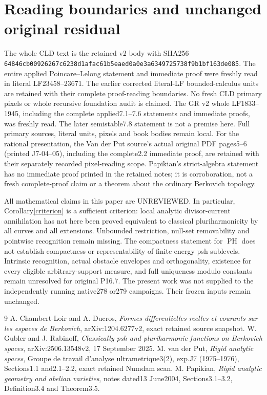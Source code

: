 \documentclass[11pt]{article}
\newcommand{\PH}{\operatorname{PH}}
\begin{document}
\section{Reading boundaries and unchanged original residual}
The whole CLD text is the retained v2 body with SHA256
\texttt{64846cb00926267c6238d1afac61b5eaed0a0e3a6349725738f9b1bf163de085}.
The entire applied Poincare--Lelong statement and immediate proof were
freshly read in literal LF23458--23671. The earlier corrected literal-LF
bounded-calculus units are retained with their complete proof-reading
boundaries. No fresh CLD primary pixels or whole recursive foundation
audit is claimed. The GR v2 whole LF1833--1945, including the complete
applied7.1--7.6 statements and immediate proofs, was freshly read.
The later semistable7.8 statement is not a premise here. Full primary
sources, literal units, pixels and book bodies remain local.
For the rational presentation, the Van der Put source's actual original
PDF pages5--6 (printed J7-04--05), including the complete2.2 immediate
proof, are retained with their separately recorded pixel-reading scope.
Papikian's strict-algebra statement has no immediate proof printed in
the retained notes; it is corroboration, not a fresh complete-proof
claim or a theorem about the ordinary Berkovich topology.

All mathematical claims in this paper are UNREVIEWED. In particular,
Corollary\ref{criterion} is a sufficient criterion: local analytic
divisor-current annihilation has not here been proved equivalent to
classical pluriharmonicity by all curves and all extensions. Unbounded
restriction, null-set removability and pointwise recognition remain
missing. The compactness statement for $\PH$ does not establish
compactness or representability of finite-energy psh sublevels.
Intrinsic recognition, actual obstacle envelopes and orthogonality,
existence for every eligible arbitrary-support measure, and full
uniqueness modulo constants remain unresolved for original P16.7.
The present work was not supplied to the independently running
native278 or279 campaigns. Their frozen inputs remain unchanged.

\begin{thebibliography}{9}
 A. Chambert-Loir and A. Ducros,
\emph{Formes differentielles reelles et courants sur les espaces de
Berkovich}, arXiv:1204.6277v2, exact retained source snapshot.
 W. Gubler and J. Rabinoff,
\emph{Classically psh and pluriharmonic functions on Berkovich spaces},
arXiv:2506.13548v2, 17 September 2025.
 M. van der Put, \emph{Rigid analytic spaces},
Groupe de travail d'analyse ultrametrique3(2), exp.J7 (1975--1976),
Sections1.1 and2.1--2.2, exact retained Numdam scan.
 M. Papikian, \emph{Rigid analytic geometry and abelian
varieties}, notes dated13 June2004, Sections3.1--3.2, Definition3.4
and Theorem3.5.
\end{thebibliography}
\end{document}
